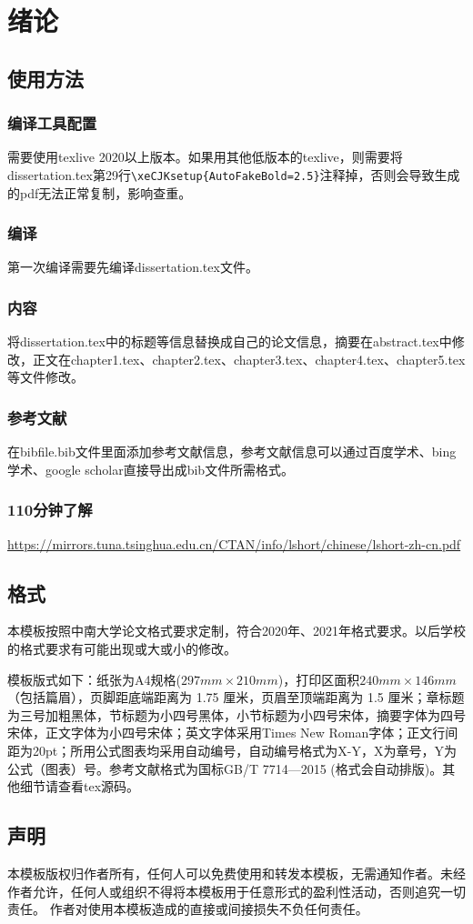 \chapter{绪论}
\section{使用方法}
\subsection{编译工具配置}
需要使用texlive 2020以上版本。如果用其他低版本的texlive，则需要将dissertation.tex第29行\verb|\xeCJKsetup{AutoFakeBold=2.5}|注释掉，否则会导致生成的pdf无法正常复制，影响查重。

\subsection{编译}
第一次编译需要先编译dissertation.tex文件。

\subsection{内容}
将dissertation.tex中的标题等信息替换成自己的论文信息，摘要在abstract.tex中修改，正文在chapter1.tex、chapter2.tex、chapter3.tex、chapter4.tex、chapter5.tex等文件修改。

\subsection{参考文献}
在bibfile.bib文件里面添加参考文献信息，参考文献信息可以通过百度学术、bing学术、google scholar直接导出成bib文件所需格式。

\subsection{110分钟了解\LaTeXe}
\href{https://mirrors.tuna.tsinghua.edu.cn/CTAN/info/lshort/chinese/lshort-zh-cn.pdf}{https://mirrors.tuna.tsinghua.edu.cn/CTAN/info/lshort/chinese/lshort-zh-cn.pdf}

\section{格式}
本模板按照中南大学论文格式要求定制，符合2020年、2021年格式要求。以后学校的格式要求有可能出现或大或小的修改。

模板版式如下：纸张为A4规格($297mm\times210mm$)，打印区面积$240mm\times146mm$（包括篇眉），页脚距底端距离为 1.75 厘米，页眉至顶端距离为 1.5 厘米；章标题为三号加粗黑体，节标题为小四号黑体，小节标题为小四号宋体，摘要字体为四号宋体，正文字体为小四号宋体；英文字体采用Times New Roman字体；正文行间距为20pt；所用公式图表均采用自动编号，自动编号格式为X-Y，X为章号，Y为公式（图表）号。参考文献格式为国标GB/T 7714—2015 (格式会自动排版)。其他细节请查看tex源码。

\section{声明}
本模板版权归作者所有，任何人可以免费使用和转发本模板，无需通知作者。未经作者允许，任何人或组织不得将本模板用于任意形式的盈利性活动，否则追究一切责任。
作者对使用本模板造成的直接或间接损失不负任何责任。
